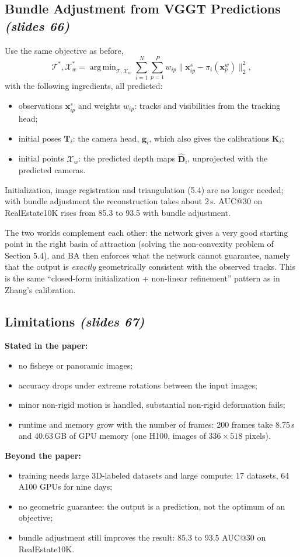 \documentclass[11pt,a4paper]{article}
\newcommand{\slr}[1]{\texorpdfstring{\emph{(slides #1)}}{(slides #1)}}
\DeclareMathOperator{\argmin}{arg\,min}
\begin{document}
\subsection{Bundle Adjustment from VGGT Predictions \slr{66}}
Use the same objective as before,
\[
\mathcal T^*,\mathcal X_w^*=\argmin_{\mathcal T,\mathcal X_w}\sum_{i=1}^N\sum_{p=1}^P w_{ip}\bigl\lVert\bm x^s_{ip}-\pi_i(\bm x^w_p)\bigr\rVert_2^2,
\]
with the following ingredients, all predicted:
\begin{itemize}
\item observations $\bm x^s_{ip}$ and weights $w_{ip}$: tracks and visibilities from the tracking head;
\item initial poses $\bm T_i$: the camera head, $\hat{\bm g}_i$, which also gives the calibrations $\bm K_i$;
\item initial points $\mathcal X_w$: the predicted depth maps $\hat{\bm D}_i$, unprojected with the predicted cameras.
\end{itemize}
Initialization, image registration and triangulation (5.4) are no longer needed; with bundle adjustment the reconstruction takes about 2\,s. AUC@30 on RealEstate10K rises from 85.3 to 93.5 with bundle adjustment.

\begin{intuition}
The two worlds complement each other: the network gives a very good starting point in the right basin of attraction (solving the non-convexity problem of Section 5.4), and BA then enforces what the network cannot guarantee, namely that the output is \emph{exactly} geometrically consistent with the observed tracks. This is the same ``closed-form initialization + non-linear refinement'' pattern as in Zhang's calibration.
\end{intuition}

\subsection{Limitations \slr{67}}
\textbf{Stated in the paper:}
\begin{itemize}
\item no fisheye or panoramic images;
\item accuracy drops under extreme rotations between the input images;
\item minor non-rigid motion is handled, substantial non-rigid deformation fails;
\item runtime and memory grow with the number of frames: 200 frames take 8.75\,s and 40.63\,GB of GPU memory (one H100, images of $336\times518$ pixels).
\end{itemize}
\textbf{Beyond the paper:}
\begin{itemize}
\item training needs large 3D-labeled datasets and large compute: 17 datasets, 64 A100 GPUs for nine days;
\item no geometric guarantee: the output is a prediction, not the optimum of an objective;
\item bundle adjustment still improves the result: 85.3 to 93.5 AUC@30 on RealEstate10K.
\end{itemize}
\end{document}
